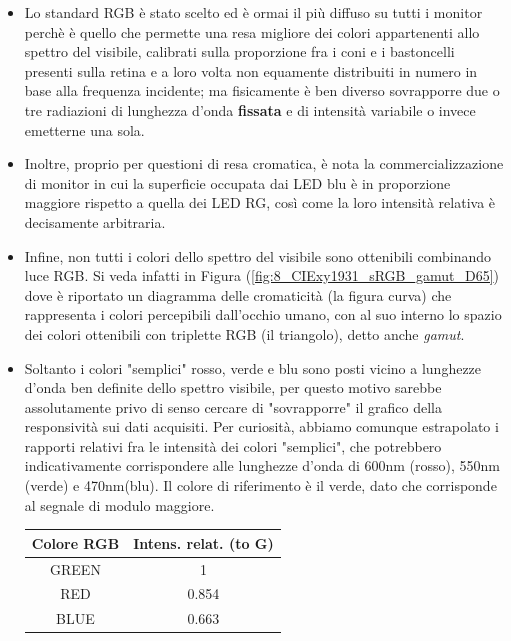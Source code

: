 \documentclass[journal, a4paper]{IEEEtran}
\begin{document}
\begin{itemize}
\item Lo standard RGB è stato scelto ed è ormai il più diffuso su tutti i monitor perchè è quello che permette una resa migliore dei colori appartenenti allo spettro del visibile, calibrati sulla proporzione fra i coni e i bastoncelli presenti sulla retina e a loro volta non equamente distribuiti in numero in base alla frequenza incidente; ma fisicamente è ben diverso sovrapporre due o tre radiazioni di lunghezza d'onda \textbf{fissata} e di intensità variabile o invece emetterne una sola. 

\item Inoltre, proprio per questioni di resa cromatica, è nota la commercializzazione di monitor in cui la superficie occupata dai LED blu è in proporzione maggiore rispetto a quella dei LED RG, così come la loro intensità relativa è decisamente arbitraria.

\item Infine, non tutti i colori dello spettro del visibile sono ottenibili combinando luce RGB. Si veda infatti in Figura (\ref{fig:8_CIExy1931_sRGB_gamut_D65}) dove è riportato un diagramma delle cromaticità (la figura curva) che rappresenta i colori percepibili dall'occhio umano, con al suo interno lo spazio dei colori ottenibili con triplette RGB (il triangolo), detto anche \textit{gamut}.

\item Soltanto i colori "semplici" rosso, verde e blu sono posti vicino a lunghezze d'onda ben definite dello spettro visibile, per questo motivo sarebbe assolutamente privo di senso cercare di "sovrapporre" il grafico della responsività sui dati acquisiti. Per curiosità, abbiamo comunque estrapolato i rapporti relativi fra le intensità dei colori "semplici", che potrebbero indicativamente corrispondere alle lunghezze d'onda di 600nm (rosso), 550nm (verde) e 470nm(blu). Il colore di riferimento è il verde, dato che corrisponde al segnale di modulo maggiore.\\


\begin{tabular}{|c|c|}
\hline Colore RGB & Intens. relat. (to G) \\ 
\hline GREEN & 1 \\ 
\hline RED & 0.854 \\ 
\hline BLUE & 0.663 \\ 
\hline 
\end{tabular} 
\end{itemize}
~\\
\end{document}
